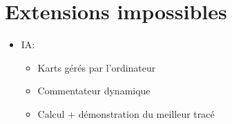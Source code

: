 \documentclass{article}
\begin{document}
\section{Extensions impossibles}
\begin{itemize}
    \item IA: \begin{itemize}
        \item Karts gérés par l'ordinateur
        \item Commentateur dynamique
        \item Calcul + démonstration du meilleur tracé
    \end{itemize}
\end{itemize}
\end{document}

